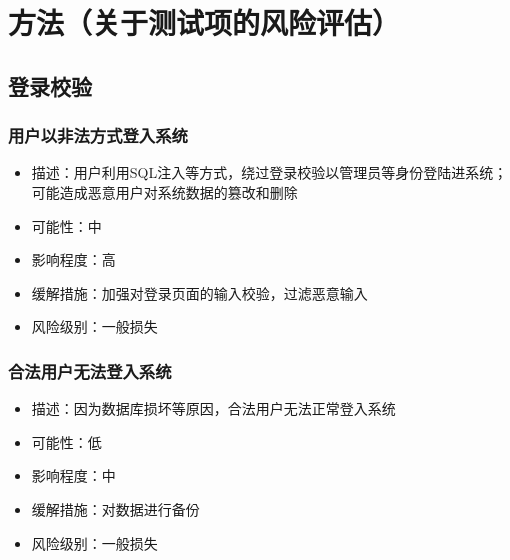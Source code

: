 \documentclass[hyperref, a4paper]{ctexart}
\providecommand{\tightlist}{%
  \setlength{\itemsep}{0pt}\setlength{\parskip}{0pt}}
\begin{document}
\hypertarget{ux65b9ux6cd5ux5173ux4e8eux6d4bux8bd5ux9879ux7684ux98ceux9669ux8bc4ux4f30}{%
\section{方法（关于测试项的风险评估）}\label{ux65b9ux6cd5ux5173ux4e8eux6d4bux8bd5ux9879ux7684ux98ceux9669ux8bc4ux4f30}}

\hypertarget{ux767bux5f55ux6821ux9a8c}{%
\subsection{登录校验}\label{ux767bux5f55ux6821ux9a8c}}

\hypertarget{ux7528ux6237ux4ee5ux975eux6cd5ux65b9ux5f0fux767bux5165ux7cfbux7edf}{%
\subsubsection{用户以非法方式登入系统}\label{ux7528ux6237ux4ee5ux975eux6cd5ux65b9ux5f0fux767bux5165ux7cfbux7edf}}

\begin{itemize}
\tightlist
\item
  描述：用户利用SQL注入等方式，绕过登录校验以管理员等身份登陆进系统；可能造成恶意用户对系统数据的篡改和删除
\item
  可能性：中
\item
  影响程度：高
\item
  缓解措施：加强对登录页面的输入校验，过滤恶意输入
\item
  风险级别：一般损失
\end{itemize}

\hypertarget{ux5408ux6cd5ux7528ux6237ux65e0ux6cd5ux767bux5165ux7cfbux7edf}{%
\subsubsection{合法用户无法登入系统}\label{ux5408ux6cd5ux7528ux6237ux65e0ux6cd5ux767bux5165ux7cfbux7edf}}

\begin{itemize}
\tightlist
\item
  描述：因为数据库损坏等原因，合法用户无法正常登入系统
\item
  可能性：低
\item
  影响程度：中
\item
  缓解措施：对数据进行备份
\item
  风险级别：一般损失
\end{itemize}
\end{document}
